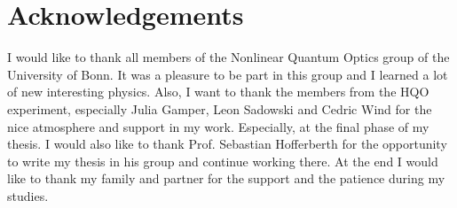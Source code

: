 \chapter*{Acknowledgements}
\label{sec:ack}

I would like to thank all members of the Nonlinear Quantum Optics group of the University of Bonn.
It was a pleasure to be part in this group and I learned a lot of new interesting physics.
Also, I want to thank the members from the HQO experiment, especially Julia Gamper, Leon Sadowski and Cedric Wind for the nice
atmosphere and support in my work.
Especially, at the final phase of my thesis.
I would also like to thank Prof. Sebastian Hofferberth for the opportunity to write my thesis in his group and continue working there.
At the end I would like to thank my family and partner for the support and the patience during my studies.

